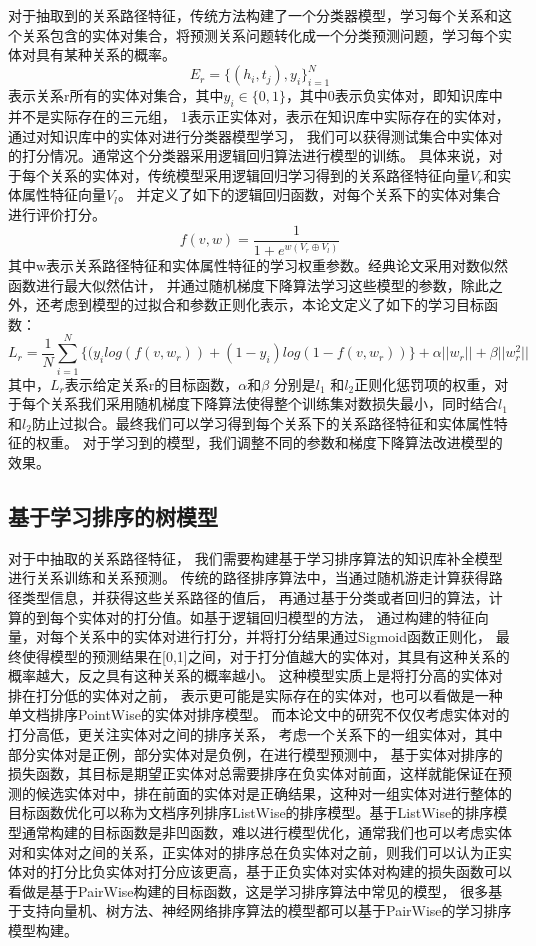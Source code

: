 对于抽取到的关系路径特征，传统方法构建了一个分类器模型，学习每个关系和这个关系包含的实体对集合，将预测关系问题转化成一个分类预测问题，学习每个实体对具有某种关系的概率。
$$E_r=\{(h_i,t_j),y_i\}^N_{i=1} $$
表示关系r所有的实体对集合，其中$y_i\in \{0,1\}$，其中0表示负实体对，即知识库中并不是实际存在的三元组，
1表示正实体对，表示在知识库中实际存在的实体对，通过对知识库中的实体对进行分类器模型学习，
我们可以获得测试集合中实体对的打分情况。通常这个分类器采用逻辑回归算法进行模型的训练。
具体来说，对于每个关系的实体对，传统模型采用逻辑回归学习得到的关系路径特征向量$V_r$和实体属性特征向量$V_l$。
并定义了如下的逻辑回归函数，对每个关系下的实体对集合进行评价打分。
$$f(v,w)=\frac{1}{1+e^{w(V_r \oplus V_l)}}$$
其中w表示关系路径特征和实体属性特征的学习权重参数。经典论文采用对数似然函数进行最大似然估计，
并通过随机梯度下降算法学习这些模型的参数，除此之外，还考虑到模型的过拟合和参数正则化表示，本论文定义了如下的学习目标函数：
$$L_r=\frac{1}{N}\sum_{i=1}^N \{(y_ilog(f(v,w_r)) + (1-y_i)log(1-f(v,w_r))\}+\alpha ||w_r||+\beta||w_r^2||$$
其中，$L_r$表示给定关系r的目标函数，$\alpha$和$\beta$ 分别是$l_1$ 和$l_2$正则化惩罚项的权重，对于每个关系我们采用随机梯度下降算法使得整个训练集对数损失最小，同时结合$l_1$ 和$l_2$防止过拟合。最终我们可以学习得到每个关系下的关系路径特征和实体属性特征的权重。
对于学习到的模型，我们调整不同的参数和梯度下降算法改进模型的效果。


\subsection{基于学习排序的树模型}
对于\label{sec:relational}中抽取的关系路径特征，
我们需要构建基于学习排序算法的知识库补全模型进行关系训练和关系预测。
传统的路径排序算法中，当通过随机游走计算获得路径类型信息，并获得这些关系路径的值后，
再通过基于分类或者回归的算法，计算的到每个实体对的打分值。如基于逻辑回归模型的方法，
通过构建的特征向量，对每个关系中的实体对进行打分，并将打分结果通过Sigmoid函数正则化，
最终使得模型的预测结果在[0,1]之间，对于打分值越大的实体对，其具有这种关系的概率越大，反之具有这种关系的概率越小。
这种模型实质上是将打分高的实体对排在打分低的实体对之前，
表示更可能是实际存在的实体对，也可以看做是一种单文档排序PointWise的实体对排序模型。
而本论文中的研究不仅仅考虑实体对的打分高低，更关注实体对之间的排序关系，
考虑一个关系下的一组实体对，其中部分实体对是正例，部分实体对是负例，在进行模型预测中，
基于实体对排序的损失函数，其目标是期望正实体对总需要排序在负实体对前面，这样就能保证在预测的候选实体对中，排在前面的实体对是正确结果，这种对一组实体对进行整体的目标函数优化可以称为文档序列排序ListWise的排序模型。基于ListWise的排序模型通常构建的目标函数是非凹函数，难以进行模型优化，通常我们也可以考虑实体对和实体对之间的关系，正实体对的排序总在负实体对之前，则我们可以认为正实体对的打分比负实体对打分应该更高，基于正负实体对实体对构建的损失函数可以看做是基于PairWise构建的目标函数，这是学习排序算法中常见的模型，
很多基于支持向量机、树方法、神经网络排序算法的模型都可以基于PairWise的学习排序模型构建。

